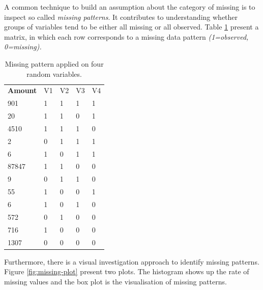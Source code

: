 A common technique to build an assumption about the category of missing is to inspect so called \textit{missing patterns}. It contributes to understanding whether groups of variables tend to be either all missing or all observed. Table \ref{tab:variable-pattern-example} present a matrix, in which each row corresponds to a missing data pattern \textit{(1=observed, 0=missing).} 

\begin{table}[h!]
\centering
\caption{Missing pattern applied on four random variables.}
\label{tab:variable-pattern-example}
\begin{tabular}{lllll}
\textbf{Amount} & V1 & V2 & V3 & V4 \\
901             & 1           & 1           & 1           & 1           \\
20              & 1           & 1           & 0           & 1           \\
4510            & 1           & 1           & 1           & 0           \\
2               & 0           & 1           & 1           & 1           \\
6               & 1           & 0           & 1           & 1           \\
87847           & 1           & 1           & 0           & 0           \\
9               & 0           & 1           & 1           & 0           \\
55              & 1           & 0           & 0           & 1           \\
6               & 1           & 0           & 1           & 0           \\
572             & 0           & 1           & 0           & 0           \\
716             & 1           & 0           & 0           & 0           \\
1307            & 0           & 0           & 0           & 0          
\end{tabular}
\end{table}

Furthermore, there is a visual investigation approach to identify missing patterns. Figure \ref{fig:missing-plot} present two plots. The histogram shows up the rate of missing values and the box plot is the visualisation of missing patterns.

